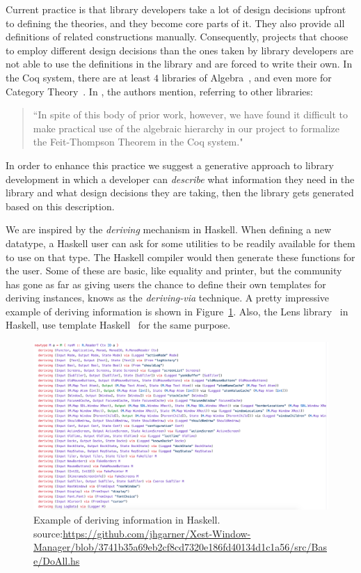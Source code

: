 Current practice is that library developers take a lot of design decisions upfront to defining the theories, and they become core parts of it. They also provide all definitions of related constructions manually. Consequently, projects that choose to employ different design decisions than the ones taken by library developers are not able to use the definitions in the library and are forced to write their own. In the Coq system, there are at least $4$ libraries of Algebra~\cite{Gonthier2009,Geuvers2002,coq-contribs-algebra,Spitters2010}, and even more for Category Theory~\cite{spivak2014coqcats}. In 
\cite{Gonthier2009}, the authors
mention, referring to other libraries:  
\begin{quote}
    ``In spite of this body of prior work, however, we have found it
    difficult to make practical use of the algebraic hierarchy in our project to
    formalize the Feit-Thompson Theorem in the Coq system."
\end{quote}

In order to enhance this practice we suggest a generative approach to library development in which a developer can \emph{describe} what information they need in the library and what design decisions they are taking, then the library gets generated based on this description. 

We are inspired by the \emph{deriving} mechanism in Haskell. When defining a new datatype, a Haskell user can ask for some utilities to be readily available for them to use on that type. The Haskell compiler would then generate these functions for the user. Some of these are basic, like equality and printer, but the community has gone as far as giving users the chance to define their own templates for deriving instances, knows as the \emph{deriving-via} technique. A pretty impressive example of deriving information is shown in Figure~\ref{fig:deriving-via-example}. 
Also, the Lens library~\cite{lensesLib} in Haskell, use template Haskell~\cite{sheard2002TH} for the same purpose. 

\begin{figure}
 \includegraphics[scale=0.5,width=\linewidth]{figures/deriving-via-example.png}
 \caption{Example of deriving information in Haskell. source:\url{https://github.com/jhgarner/Xest-Window-Manager/blob/3741b35a69eb2cf8cd7320e186fd40134d1c1a56/src/Base/DoAll.hs}}
 \label{fig:deriving-via-example}
\end{figure}

